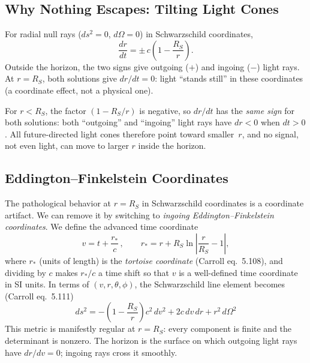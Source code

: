 \subsection{Why Nothing Escapes: Tilting Light Cones}
\label{sec:dg_light_cones}

For radial null rays ($ds^2 = 0$, $d\Omega = 0$) in Schwarzschild
coordinates,
\begin{equation}
    \frac{dr}{dt} = \pm\, c\left(1 - \frac{R_S}{r}\right) .
    \label{eq:radial_null}
\end{equation}
Outside the horizon, the two signs give outgoing ($+$) and ingoing ($-$)
light rays.  At $r = R_S$, both solutions give $dr/dt = 0$: light
``stands still'' in these coordinates (a coordinate effect, not a
physical one).

For $r < R_S$, the factor $(1 - R_S/r)$ is negative, so
$dr/dt$ has the \emph{same sign} for both solutions: both
``outgoing'' and ``ingoing'' light rays have $dr < 0$ when $dt > 0$.
All future-directed light cones therefore point toward
smaller~$r$, and no signal, not even light, can move to larger $r$
inside the horizon.

\subsection{Eddington--Finkelstein Coordinates}
\label{sec:dg_eddington_finkelstein}

The pathological behavior at $r = R_S$ in Schwarzschild coordinates
is a coordinate artifact.  We can remove it by switching to
\emph{ingoing Eddington--Finkelstein coordinates}.  We define the
advanced time coordinate
\begin{equation}
    v = t + \frac{r_*}{c} \,, \qquad
    r_* = r + R_S \ln\!\left|\frac{r}{R_S} - 1\right| ,
    \label{eq:tortoise_and_v}
\end{equation}
where $r_*$ (units of length) is the \emph{tortoise coordinate}
(Carroll eq.~5.108), and dividing by $c$ makes $r_*/c$ a time shift
so that $v$ is a well-defined time coordinate in SI units.
In terms of $(v, r, \theta, \phi)$, the Schwarzschild line element
becomes (Carroll eq.~5.111)
\begin{equation}
    \boxed{
    ds^2 = -\!\left(1 - \frac{R_S}{r}\right) c^2\, dv^2
    + 2c\, dv\, dr + r^2\, d\Omega^2
    }
    \label{eq:eddington_finkelstein}
\end{equation}
This metric is manifestly regular at $r = R_S$: every component is
finite and the determinant is nonzero.  The horizon is the
surface on which outgoing light rays have $dr/dv = 0$; ingoing rays cross
it smoothly.

